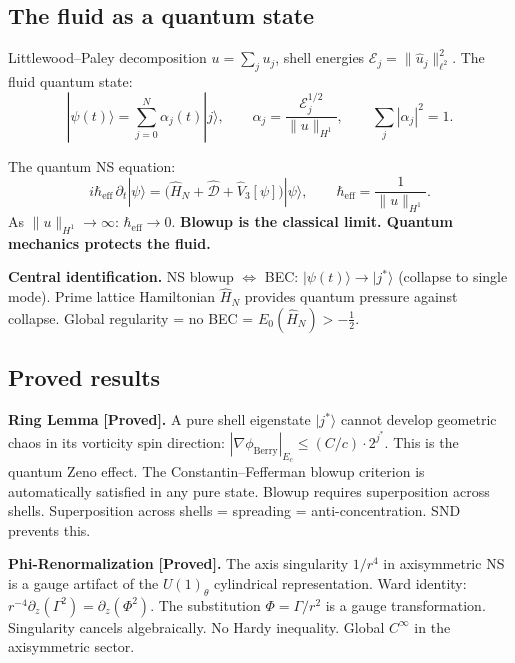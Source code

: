 \documentclass[12pt]{article}
\newcommand{\ket}[1]{|{#1}\rangle}
\newcommand{\half}{\tfrac{1}{2}}
\begin{document}
\subsection{The fluid as a quantum state}

Littlewood--Paley decomposition $u = \sum_j u_j$, shell energies
$\mathcal{E}_j = \|\hat{u}_j\|_{\ell^2}^2$.
The fluid quantum state:
\[
  \ket{\psi(t)} = \sum_{j=0}^N \alpha_j(t)\ket{j},
  \qquad \alpha_j = \frac{\mathcal{E}_j^{1/2}}{\|u\|_{H^1}},
  \qquad \sum_j|\alpha_j|^2 = 1.
\]

The quantum NS equation:
\[
  i\hbar_{\mathrm{eff}}\,\partial_t\ket{\psi}
  = \bigl(\hat{H}_N + \hat{\mathcal{D}} + \hat{V}_3[\psi]\bigr)\ket{\psi},
  \qquad \hbar_{\mathrm{eff}} = \frac{1}{\|u\|_{H^1}}.
\]
As $\|u\|_{H^1}\to\infty$: $\hbar_{\mathrm{eff}}\to0$.
\textbf{Blowup is the classical limit. Quantum mechanics protects the fluid.}

\begin{tcolorbox}[qbox]
\textbf{Central identification.}
NS blowup $\Longleftrightarrow$ BEC:
$\ket{\psi(t)}\to\ket{j^*}$ (collapse to single mode).
Prime lattice Hamiltonian $\hat{H}_N$ provides quantum pressure against collapse.
Global regularity = no BEC = $E_0(\hat{H}_N) > -\half$.
\end{tcolorbox}

\subsection{Proved results}

\begin{tcolorbox}[provedbox]
\textbf{Ring Lemma} \cite{Ring2026} \textbf{[Proved].}
A pure shell eigenstate $\ket{j^*}$ cannot develop geometric chaos
in its vorticity spin direction:
$|\nabla\phi_{\mathrm{Berry}}|_{E_c} \le (C/c)\cdot2^{j^*}$.
This is the quantum Zeno effect.
The Constantin--Fefferman blowup criterion is automatically satisfied
in any pure state.
Blowup requires superposition across shells.
Superposition across shells = spreading = anti-concentration.
SND prevents this.
\end{tcolorbox}

\begin{tcolorbox}[provedbox]
\textbf{Phi-Renormalization} \cite{Phi2026} \textbf{[Proved].}
The axis singularity $1/r^4$ in axisymmetric NS is a gauge artifact
of the $U(1)_\theta$ cylindrical representation.
Ward identity: $r^{-4}\partial_z(\Gamma^2) = \partial_z(\Phi^2)$.
The substitution $\Phi = \Gamma/r^2$ is a gauge transformation.
Singularity cancels algebraically. No Hardy inequality. Global $C^\infty$
in the axisymmetric sector.
\end{tcolorbox}
\end{document}
